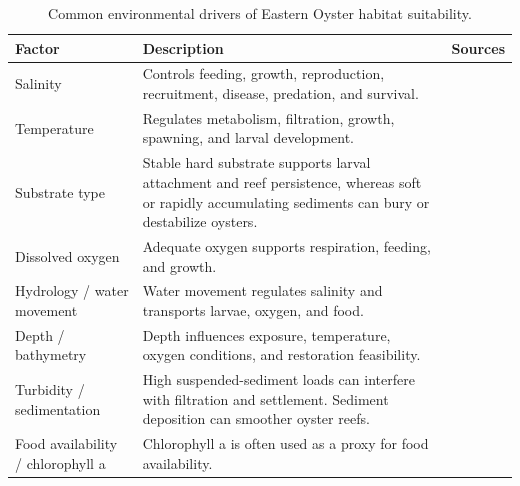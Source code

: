 \documentclass[
  review]{elsarticle}
\begin{document}
\begin{landscape}


\begin{longtable}[]{@{}
  >{\raggedright\arraybackslash}p{}
  >{\raggedright\arraybackslash}p{}
  >{\raggedright\arraybackslash}p{}@{}}

\caption{\label{tbl-environmental-drivers}Common environmental drivers
of Eastern Oyster habitat suitability.}

\tabularnewline

\toprule\noalign{}
\begin{minipage}[b]{\linewidth}\raggedright
Factor
\end{minipage} & \begin{minipage}[b]{\linewidth}\raggedright
Description
\end{minipage} & \begin{minipage}[b]{\linewidth}\raggedright
Sources
\end{minipage} \\
\midrule\noalign{}
\endhead
\bottomrule\noalign{}
\endlastfoot
Salinity & Controls feeding, growth, reproduction, recruitment, disease,
predation, and survival. &
\citep{Barnes2007, Birch2021, Christensen1997, Geselbracht2024, LaPeyre2021, Pollack2012} \\
Temperature & Regulates metabolism, filtration, growth, spawning, and
larval development. &
\citep{Barnes2007, Christensen1997, Geselbracht2024, LaPeyre2021, Pollack2012} \\
Substrate type & Stable hard substrate supports larval attachment and
reef persistence, whereas soft or rapidly accumulating sediments can
bury or destabilize oysters. &
\citep{Barnes2007, Birch2021, Christensen1997, Geselbracht2024, LaPeyre2021} \\
Dissolved oxygen & Adequate oxygen supports respiration, feeding, and
growth. &
\citep{Christensen1997, Geselbracht2024, LaPeyre2021, Pollack2012} \\
Hydrology / water movement & Water movement regulates salinity and
transports larvae, oxygen, and food. &
\citep{Barnes2007, Geselbracht2024, LaPeyre2021} \\
Depth / bathymetry & Depth influences exposure, temperature, oxygen
conditions, and restoration feasibility. &
\citep{Christensen1997, Geselbracht2024, Pollack2012} \\
Turbidity / sedimentation & High suspended-sediment loads can interfere
with filtration and settlement. Sediment deposition can smoother oyster
reefs. &
\citep{LaPeyre2021, Pollack2012} \\
Food availability / chlorophyll a & Chlorophyll a is often used as a
proxy for food availability. &
\citep{Geselbracht2024, LaPeyre2021} \\

\end{longtable}

\end{landscape}
\end{document}
